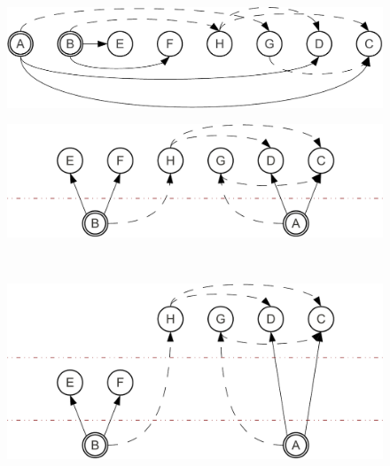 
\begin{figure}[t]
  \vspace{-5mm}
  \begin{minipage}[b]{0.5\linewidth}
    \centering
    \includegraphics[scale=0.4]{figures/complementation/steps-0-crop.pdf}
    \label{fig:multiple:steps:0}
  \end{minipage}
  \begin{minipage}[b]{0.5\linewidth}
    \centering
    \includegraphics[scale=0.4]{figures/complementation/steps-1-crop.pdf}
    \label{fig:multiple:steps:1}
  \end{minipage}
  \\
  \begin{minipage}[b]{0.5\linewidth}
    \centering
    \includegraphics[scale=0.4]{figures/complementation/steps-2-crop.pdf}
    \label{fig:multiple:steps:2}
  \end{minipage}
  \begin{minipage}[b]{0.5\linewidth}
    \centering

\end{minipage}
\end{figure}
